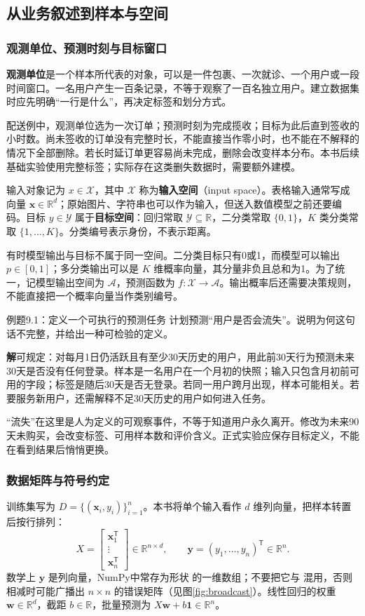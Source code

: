 \documentclass[UTF8,fontset=none,zihao=-4,a4paper]{ctexart}
\newcommand{\term}[1]{\textbf{#1}}
\newcommand{\sol}{\par\noindent\textbf{解}\quad}
\newcommand{\code}[1]{\texttt{\detokenize{#1}}}
\numberwithin{equation}{section}
\numberwithin{figure}{section}
\begin{document}
\subsection{从业务叙述到样本与空间}
\subsubsection{观测单位、预测时刻与目标窗口}
\term{观测单位}是一个样本所代表的对象，可以是一件包裹、一次就诊、一个用户或一段时间窗口。一名用户产生一百条记录，不等于观察了一百名独立用户。建立数据集时应先明确“一行是什么”，再决定标签和划分方式。

配送例中，观测单位选为一次订单；预测时刻为完成揽收；目标为此后直到签收的小时数。尚未签收的订单没有完整时长，不能直接当作零小时，也不能在不解释的情况下全部删除。若长时延订单更容易尚未完成，删除会改变样本分布。本书后续基础实验使用完整标签；实际存在这类删失数据时，需要额外建模。

输入对象记为 $x\in\mathcal X$，其中 $\mathcal X$ 称为\term{输入空间}（input space）。表格输入通常写成向量 $\symbf{x}\in\mathbb R^d$；原始图片、字符串也可以作为输入，但送入数值模型之前还要编码。目标 $y\in\mathcal Y$ 属于\term{目标空间}：回归常取 $\mathcal Y\subseteq\mathbb R$，二分类常取 $\{0,1\}$，$K$ 类分类常取 $\{1,\ldots,K\}$。分类编号表示身份，不表示距离。

有时模型输出与目标不属于同一空间。二分类目标只有0或1，而模型可以输出 $p\in[0,1]$；多分类输出可以是 $K$ 维概率向量，其分量非负且总和为1。为了统一，记模型输出空间为 $\mathcal A$，预测函数为 $f:\mathcal X\to\mathcal A$。输出概率后还需要决策规则，不能直接把一个概率向量当作类别编号。

\begin{infobox}{例题9.1：定义一个可执行的预测任务}
计划预测“用户是否会流失”。说明为何这句话不完整，并给出一种可检验的定义。
\end{infobox}
\sol 可规定：对每月1日仍活跃且有至少30天历史的用户，用此前30天行为预测未来30天是否没有任何登录。样本是一名用户在一个月初的快照；输入只包含月初前可用的字段；标签是随后30天是否无登录。若同一用户跨月出现，样本可能相关。若要服务新用户，还需解释不足30天历史的用户如何进入任务。

“流失”在这里是人为定义的可观察事件，不等于知道用户永久离开。修改为未来90天未购买，会改变标签、可用样本数和评价含义。正式实验应保存目标定义，不能在看到结果后悄悄更换。

\subsubsection{数据矩阵与符号约定}
训练集写为 $D=\{(\symbf{x}_i,y_i)\}_{i=1}^n$。本书将单个输入看作 $d$ 维列向量，把样本转置后按行排列：
\[
 X=\begin{bmatrix}\symbf{x}_1^{\mathsf T}\\ \vdots\\ \symbf{x}_n^{\mathsf T}\end{bmatrix}\in\mathbb R^{n\times d},\qquad
 \symbf{y}=(y_1,\ldots,y_n)^{\mathsf T}\in\mathbb R^n.
\]
数学上 $\symbf y$ 是列向量，NumPy中常存为形状 \code{(n,)} 的一维数组；不要把它与 \code{(n,1)} 混用，否则相减时可能广播出 $n\times n$ 的错误矩阵（见图\ref{fig:broadcast}）。线性回归的权重 $\symbf w\in\mathbb R^d$，截距 $b\in\mathbb R$，批量预测为 $X\symbf w+b\symbf1\in\mathbb R^n$。
\end{document}
